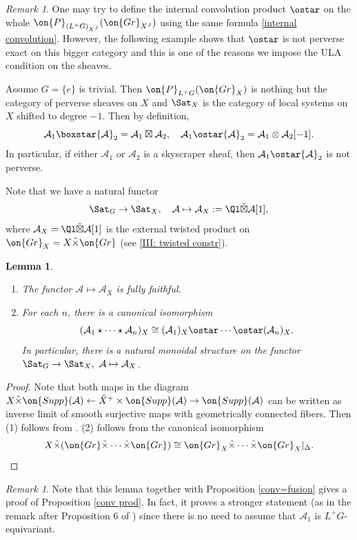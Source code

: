 \documentclass[]{pcmi}
\theoremstyle{plain}
\newtheorem{lem}[equation]{Lemma}
\theoremstyle{remark}
\newtheorem{rmk}[equation]{Remark}
\theoremstyle{definition}
\newcommand{\mA}{{\mathcal A}}
\newcommand{\Gr}{{\on{Gr}}}
\begin{document}
\begin{rmk}\label{triv group}
One may try to define the internal convolution product $\ostar$ on the whole $\on{P}_{(L^+G)_{X^J}}(\Gr_{X^J})$ using the same formula \eqref{internal convolution}. However, the following example shows that $\ostar$ is not perverse exact on this bigger category and this is one of the reasons we impose the ULA condition on the sheaves.

Assume $G=\{e\}$ is trivial. Then $\on{P}_{L^+G}(\Gr_X)$ is nothing but the category of perverse sheaves on $X$ and $\Sat_X$ is the category of local systems on $X$ shifted to degree $-1$. Then by definition, 
$$\mA_1\boxstar\mA_2=\mA_1\boxtimes\mA_2,\quad \mA_1\ostar\mA_2=\mA_1\otimes\mA_2[-1].$$
In particular, if either $\mA_1$ or $\mA_2$ is a skyscraper sheaf, then $\mA_1\ostar\mA_2$ is not perverse. 
\end{rmk}

Note that we have a natural functor
\[\Sat_G\to \Sat_X,\quad \mA\mapsto \mA_X:=\Ql\tilde\boxtimes\mA[1],\]
where $\mA_X=\Ql\tilde\boxtimes\mA[1]$ is the external twisted product on $\Gr_X=X\tilde\times\Gr$ (see \eqref{III: twisted constr}). 
\begin{lem}~
\begin{enumerate}
\item The functor $\mA\mapsto \mA_X$ is fully faithful.
\item For each $n$, there is a canonical isomorphism 
$$(\mA_1\star\cdots\star\mA_n)_X\cong (\mA_1)_X\ostar\cdots\ostar(\mA_n)_X.$$
In particular, there is a natural monoidal structure on the functor $\Sat_G\to \Sat_X,\ \mA\mapsto \mA_X$. 
\end{enumerate}
\end{lem}
\begin{proof}Note that both maps in the diagram $X\tilde\times \on{Supp}(\mA)\leftarrow \hat X^+\times \on{Supp}(\mA)\to \on{Supp}(\mA)$ can be written as inverse limit of smooth surjective maps with geometrically connected fibers. Then (1) follows from \cite[Proposition 4.2.5]{BBD}. (2) follows from the canonical isomorphism 
$$X\tilde\times (\Gr\tilde\times\cdots\tilde\times\Gr)\cong \Gr_X\tilde\times\cdots\tilde\times\Gr_X|_\Delta.$$
\end{proof}
\begin{rmk}\label{conv perverse}
Note that this lemma together with Proposition \ref{conv=fusion} gives a proof of Proposition \ref{conv prod}. In fact, it proves a stronger statement (as in the remark after Proposition 6 of \cite{Ga}) since there is no need to assume that $\mA_1$ is $L^+G$-equivariant.
\end{rmk}
\end{document}
